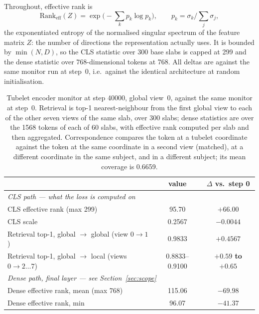 \documentclass[11pt,a4paper]{article}
\newcommand{\best}[1]{\textbf{#1}}
\begin{document}
Throughout, effective rank is
\begin{equation}
  \mathrm{Rank}_{\mathrm{eff}}(Z) = \exp\Big(-\sum_k p_k \log p_k\Big),
  \qquad p_k = \sigma_k \Big/ \sum_j \sigma_j,
  \label{eq:erank}
\end{equation}
the exponentiated entropy of the normalised singular spectrum of the feature matrix $Z$: the number of
directions the representation actually uses. It is bounded by $\min(N, D)$, so the CLS statistic over
\num{300} base slabs is capped at \num{299} and the dense statistic over $768$-dimensional tokens at
\num{768}. All deltas are against the same monitor run at step~0, i.e.\ against the identical
architecture at random initialisation.

\begin{table}[H]
  \centering
  \small
  \caption{Tubelet encoder monitor at step \num{40000}, global view~0, against the same monitor at
  step~0. Retrieval is top-1 nearest-neighbour from the first global view to each of the other seven
  views of the same slab, over \num{300} slabs; dense statistics are over the \num{1568} tokens of each
  of \num{60} slabs, with effective rank computed per slab and then aggregated. Correspondence compares
  the token at a tubelet coordinate against the token at the same coordinate in a second view (matched),
  at a different coordinate in the same subject, and in a different subject; its mean coverage is
  \num{0.6659}.}
  \label{tab:cls}
  \begin{tabular}{lcc}
    \toprule
    & value & $\Delta$ vs.\ step 0 \\
    \midrule
    \multicolumn{3}{l}{\emph{CLS path --- what the loss is computed on}} \\
    \quad CLS effective rank (max \num{299}) & 95.70 & \best{$+66.00$} \\
    \quad CLS scale & 0.2567 & $-0.0044$ \\
    \quad Retrieval top-1, global $\to$ global (view $0\!\to\!1$) & 0.9833 & \best{$+0.4567$} \\
    \quad Retrieval top-1, global $\to$ local (views $0\!\to\!2\dots7$) & 0.8833--0.9100 &
      \best{$+0.59$ to $+0.65$} \\
    \midrule
    \multicolumn{3}{l}{\emph{Dense path, final layer --- see Section~\ref{sec:scope}}} \\
    \quad Dense effective rank, mean (max \num{768}) & 115.06 & \best{$-69.98$} \\
    \quad Dense effective rank, min & 96.07 & $-41.37$ \\

\end{tabular}
\end{table}
\end{document}
